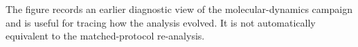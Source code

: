 The figure records an earlier diagnostic view of the molecular-dynamics campaign and is useful for tracing how the analysis evolved. It is not automatically equivalent to the matched-protocol re-analysis.
